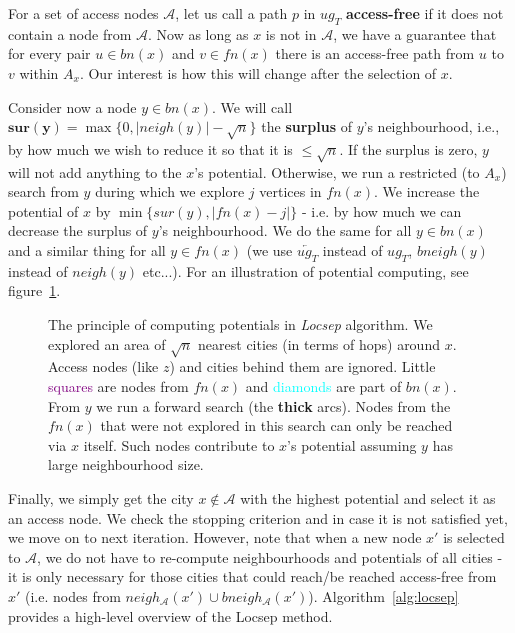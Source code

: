 		For a set of access nodes $\mathcal{A}$, let us call a path $p$ in $ug_{T}$ \textbf{access-free} if it does not contain a node from $\mathcal{A}$. Now as long as $x$ is not in $\mathcal{A}$, we have a guarantee that for every pair $u \in bn(x)$ and $v \in fn(x)$ there is an access-free path from $u$ to $v$ within $A_{x}$. Our interest is how this will change after the selection of $x$.
				
		Consider now a node $y \in bn(x)$. We will call $\bm{sur(y)} = \max\{0, |neigh(y)| - \sqrt{n}\}$ the \textbf{surplus} of $y$'s neighbourhood, i.e., by how much we wish to reduce it so that it is $\leq \sqrt{n}$. If the surplus is zero, $y$ will not add anything to the $x$'s potential. Otherwise, we run a restricted (to $A_{x}$) search from $y$ during which we explore $j$ vertices in $fn(x)$. We increase the potential of $x$ by $\min\{sur(y), |fn(x) - j|\}$ - i.e. by how much we can decrease the surplus of $y$'s neighbourhood. We do the same for all $y \in bn(x)$ and a similar thing for all $y \in fn(x)$ (we use $\overleftarrow{ug_{T}}$ instead of $ug_{T}$, $bneigh(y)$ instead of $neigh(y)$ etc...). For an illustration of potential computing, see figure~\ref{fig:locsep}. \\
		
		\begin{figure}[h!]
			\begin{center}
			\end{center}
			\caption{\label{fig:locsep} The principle of computing potentials in \textit{Locsep} algorithm. We explored an area of $\sqrt{n}$ nearest cities (in terms of hops) around $x$. Access nodes (like $z$) and cities behind them are ignored. Little \textcolor{purple}{squares} are nodes from $fn(x)$ and \textcolor{cyan}{diamonds} are part of $bn(x)$. From $y$ we run a forward search (the \textbf{thick} arcs). Nodes from the $fn(x)$ that were not explored in this search can only be reached via $x$ itself. Such nodes contribute to $x$'s potential assuming $y$ has large neighbourhood size.}
		\end{figure}

		\noindent Finally, we simply get the city $x \not \in \mathcal{A}$ with the highest potential and select it as an access node. We check the stopping criterion and in case it is not satisfied yet, we move on to next iteration. However, note that when a new node $x'$ is selected to $\mathcal{A}$, we do not have to re-compute neighbourhoods and potentials of all cities - it is only necessary for those cities that could reach/be reached access-free from $x'$ (i.e. nodes from $neigh_{\mathcal{A}}(x') \cup bneigh_{\mathcal{A}}(x')$). Algorithm~\ref{alg:locsep} provides a high-level overview of the Locsep method. \\
		
